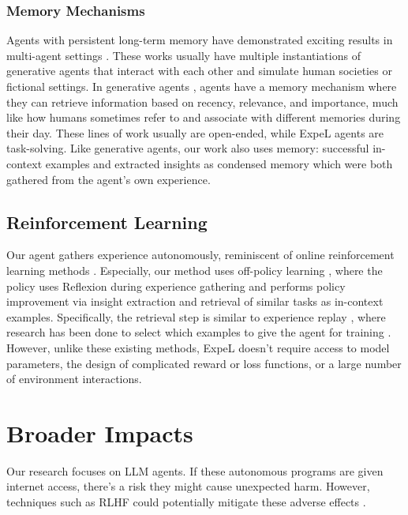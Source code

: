 \documentclass[letterpaper]{article} %
\begin{document}
\subsubsection{Memory Mechanisms}
\label{sec:memory_mechanisms}
Agents with persistent long-term memory have demonstrated exciting results in multi-agent settings \cite{park2023generative,fable2023showrunner,qian2023communicative}. These works usually have multiple instantiations of generative agents that interact with each other and simulate human societies or fictional settings. In generative agents \cite{park2023generative}, agents have a memory mechanism where they can retrieve information based on recency, relevance, and importance, much like how humans sometimes refer to and associate with different memories during their day. These lines of work usually are open-ended, while ExpeL agents are task-solving. Like generative agents, our work also uses memory: successful in-context examples and extracted insights as condensed memory which were both gathered from the agent's own experience.

\subsection{Reinforcement Learning}
Our agent gathers experience autonomously, reminiscent of online reinforcement learning methods \cite{sutton2018reinforcement}. Especially, our method uses off-policy learning \cite{watkins1992q}, where the policy uses Reflexion during experience gathering and performs policy improvement via insight extraction and retrieval of similar tasks as in-context examples. Specifically, the retrieval step is similar to experience replay \cite{lin1992self}, where research has been done to select which examples to give the agent for training \cite{schaul2015prioritized,yue2023offline}. However, unlike these existing methods, ExpeL doesn't require access to model parameters, the design of complicated reward or loss functions, or a large number of environment interactions.

\section{Broader Impacts}
\label{sec:broader_impacts}
Our research focuses on LLM agents. If these autonomous programs are given internet access, there's a risk they might cause unexpected harm. However, techniques such as RLHF could potentially mitigate these adverse effects \cite{nakano2021webgpt,ouyang2022training}.
\end{document}
